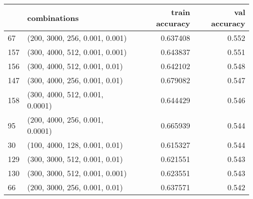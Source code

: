 \begin{tabular}{llrr}
\toprule
{} &                     combinations &  train accuracy &  val accuracy \\
\midrule
67  &   (200, 3000, 256, 0.001, 0.001) &        0.637408 &         0.552 \\
157 &   (300, 4000, 512, 0.001, 0.001) &        0.643837 &         0.551 \\
156 &    (300, 4000, 512, 0.001, 0.01) &        0.642102 &         0.548 \\
147 &    (300, 4000, 256, 0.001, 0.01) &        0.679082 &         0.547 \\
158 &  (300, 4000, 512, 0.001, 0.0001) &        0.644429 &         0.546 \\
95  &  (200, 4000, 256, 0.001, 0.0001) &        0.665939 &         0.544 \\
30  &    (100, 4000, 128, 0.001, 0.01) &        0.615327 &         0.544 \\
129 &    (300, 3000, 512, 0.001, 0.01) &        0.621551 &         0.543 \\
130 &   (300, 3000, 512, 0.001, 0.001) &        0.623551 &         0.543 \\
66  &    (200, 3000, 256, 0.001, 0.01) &        0.637571 &         0.542 \\
\bottomrule
\end{tabular}

